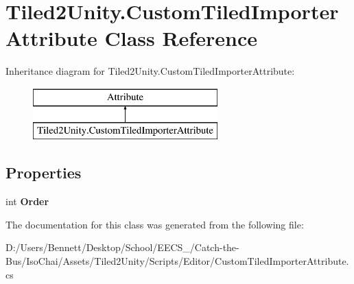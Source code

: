 \hypertarget{class_tiled2_unity_1_1_custom_tiled_importer_attribute}{}\section{Tiled2\+Unity.\+Custom\+Tiled\+Importer\+Attribute Class Reference}
\label{class_tiled2_unity_1_1_custom_tiled_importer_attribute}
Inheritance diagram for Tiled2\+Unity.\+Custom\+Tiled\+Importer\+Attribute\+:\begin{figure}[H]
\begin{center}
\leavevmode
\includegraphics[height=2.000000cm]{class_tiled2_unity_1_1_custom_tiled_importer_attribute}
\end{center}
\end{figure}
\subsection*{Properties}
\begin{DoxyCompactItemize}
\item 
\mbox{\label{class_tiled2_unity_1_1_custom_tiled_importer_attribute_ad1ed82004dd88b76c48c01094e871752}} 
int {\bfseries Order}
\end{DoxyCompactItemize}


The documentation for this class was generated from the following file\+:\begin{DoxyCompactItemize}
\item 
D\+:/\+Users/\+Bennett/\+Desktop/\+School/\+E\+E\+C\+S\+\_/\+Catch-\/the-\/\+Bus/\+Iso\+Chai/\+Assets/\+Tiled2\+Unity/\+Scripts/\+Editor/Custom\+Tiled\+Importer\+Attribute.\+cs\end{DoxyCompactItemize}
